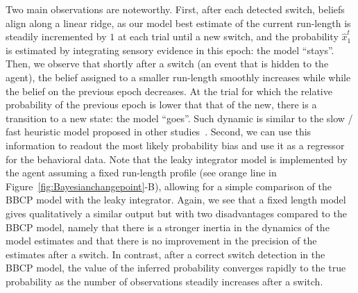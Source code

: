 \documentclass[10pt,letterpaper]{article}
\newcommand{\citep}[1]{\cite{#1}}
\newcommand{\seeFig}[1]{Figure~\ref{fig:#1}}
\begin{document}
Two main observations are noteworthy. First, after each detected switch, beliefs align along a linear ridge,
as our model best estimate of the current run-length is steadily incremented by $1$ at each trial until a new switch,
and the probability $\hat{x}_1^t$ is estimated  by integrating sensory evidence in this epoch: the model  ``stays''.
Then, we observe that shortly after a switch (an event that is hidden to the agent),
the belief assigned to a smaller run-length smoothly increases while
while the belief on the previous epoch decreases.
At the trial for which the relative probability of the previous epoch
is lower that that of the new,
there is a transition to a new state: the model ``goes''.
Such dynamic is similar to the slow / fast heuristic model proposed in other studies~\citep{Schutz14}.
Second, we can use this information to readout the most likely probability bias and
use it as a regressor for the behavioral data.
Note that the leaky integrator model is implemented
by the agent assuming a fixed run-length profile (see orange line in \seeFig{Bayesianchangepoint}-B),
allowing for a simple comparison of the BBCP model with the leaky integrator.
Again, we see that a fixed length model gives qualitatively a similar output
but with two disadvantages compared to the BBCP model, namely that
there is a stronger inertia in the dynamics of the model estimates and
that there is no improvement in the precision of the estimates after a switch.
In contrast, after a correct switch detection in the BBCP model,
the value of the inferred probability converges rapidly to the true probability
as the number of observations steadily increases after a switch.
\end{document}
